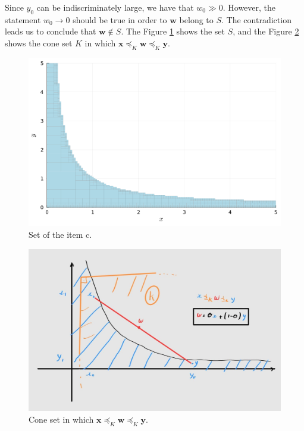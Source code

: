 \documentclass[12pt,a4paper]{article}
\begin{document}
Since \(y_0\) can be indiscriminately large, we have that \(w_0 \gg 0\). However, the statement \(w_0 \rightarrow 0\) should be true in order to \(\mathbf{w}\) belong to \(S\). The contradiction leads us to conclude that \(\mathbf{w} \not\in S\). The Figure \ref{fig:2.8c} shows the set \(S\), and the Figure \ref{fig:2.8c-set} shows the cone set \(K\) in which \(\mathbf{x} \preceq_K \mathbf{w} \preceq_K \mathbf{y}\).
\begin{figure}[H]
    \centering
    \includegraphics[scale=0.4]{figs/2.8c.png}
    \caption{Set of the item c.}
    \label{fig:2.8c}
\end{figure}

\begin{figure}[H]
    \centering
    \includegraphics[scale=0.2]{figs/2.8_set.png}
    \caption{Cone set in which \(\mathbf{x} \preceq_K \mathbf{w} \preceq_K \mathbf{y}\).}
    \label{fig:2.8c-set}
\end{figure}
\end{document}
